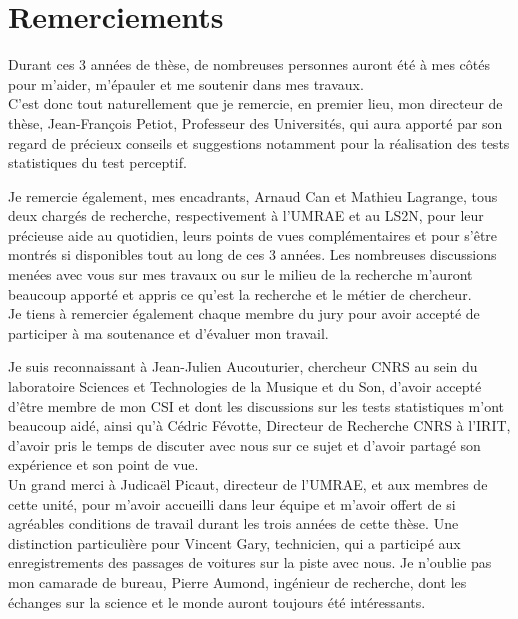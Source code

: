 \chapter*{Remerciements}


Durant ces 3 années de thèse, de nombreuses personnes auront été à mes côtés pour m'aider, m'épauler et me soutenir dans mes travaux. \\

C'est donc tout naturellement que je remercie, en premier lieu, mon directeur de thèse, Jean-François Petiot, Professeur des Universités, qui aura apporté par son regard de précieux conseils et suggestions notamment pour la réalisation des tests statistiques du test perceptif.

Je remercie également, mes encadrants, Arnaud Can et Mathieu Lagrange, tous deux chargés de recherche, respectivement à l'UMRAE et au LS2N, pour leur précieuse aide au quotidien, leurs points de vues complémentaires et pour s'être montrés si disponibles tout au long de ces 3 années. Les nombreuses discussions menées avec vous sur mes travaux ou sur le milieu de la recherche m'auront beaucoup apporté et appris ce qu'est la recherche et le métier de chercheur. \\

Je tiens à remercier également chaque membre du jury pour avoir accepté de participer à ma soutenance et d'évaluer mon travail.

Je suis reconnaissant à Jean-Julien Aucouturier, chercheur CNRS au sein du laboratoire Sciences et Technologies de la Musique et du Son, d'avoir accepté d'être membre de mon CSI et dont les discussions sur les tests statistiques m'ont beaucoup aidé, ainsi qu'à Cédric Févotte, Directeur de Recherche CNRS à l'IRIT, d'avoir pris le temps de discuter avec nous sur ce sujet et d'avoir partagé son expérience et son point de vue. \\

Un grand merci à Judicaël Picaut, directeur de l'UMRAE, et aux membres de cette unité, pour m'avoir accueilli dans leur équipe et m'avoir offert de si agréables conditions de travail durant les trois années de cette thèse. Une distinction particulière pour Vincent Gary, technicien, qui a participé aux enregistrements des passages de voitures sur la piste avec nous. Je n'oublie pas mon camarade de bureau, Pierre Aumond, ingénieur de recherche, dont les échanges sur la science et le monde auront toujours été intéressants. \\

